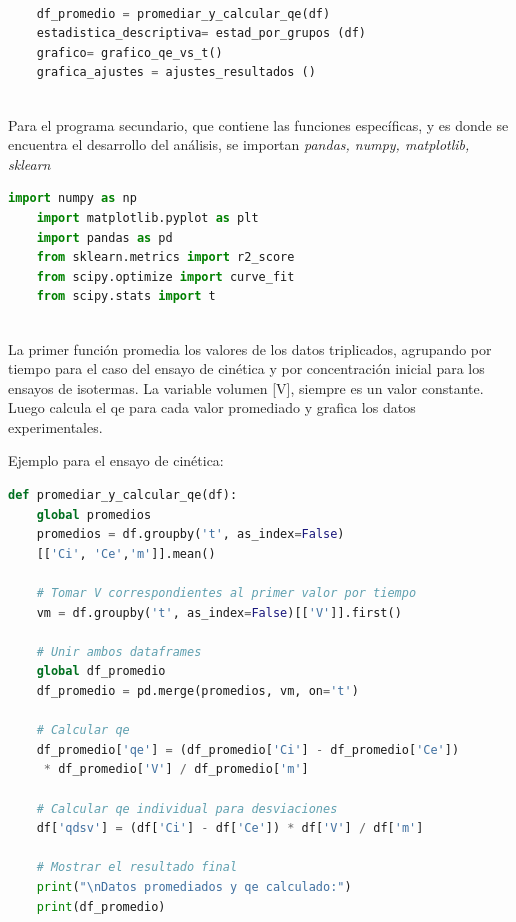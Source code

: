 \documentclass[]{article}
\begin{document}
  \begin{lstlisting}[language=Python,style=mystyle]
  	
  	df_promedio = promediar_y_calcular_qe(df)
  	estadistica_descriptiva= estad_por_grupos (df)
  	grafico= grafico_qe_vs_t()
  	grafica_ajustes = ajustes_resultados ()
  	
  \end{lstlisting} 
  
   Para el programa secundario, que contiene las funciones específicas, y es donde se encuentra el desarrollo del análisis,  se importan \textit{pandas, numpy, matplotlib, sklearn }
  \begin{lstlisting}[language=Python,style=mystyle]
  	import numpy as np
  	import matplotlib.pyplot as plt
  	import pandas as pd
  	from sklearn.metrics import r2_score
  	from scipy.optimize import curve_fit
  	from scipy.stats import t
  	
  \end{lstlisting}
  
  La primer función promedia los valores de los datos triplicados, agrupando por tiempo para el caso del ensayo de cinética y por concentración inicial para los ensayos de isotermas. La variable volumen [V], siempre es un valor constante. Luego calcula el qe para cada valor promediado y grafica los datos experimentales.
  
  
  
  
 Ejemplo para el ensayo de cinética:
 \begin{lstlisting}[language=Python,style=mystyle]	
 def promediar_y_calcular_qe(df):
 	global promedios
 	promedios = df.groupby('t', as_index=False)
 	[['Ci', 'Ce','m']].mean()
 	
 	# Tomar V correspondientes al primer valor por tiempo
 	vm = df.groupby('t', as_index=False)[['V']].first()
 	
 	# Unir ambos dataframes
 	global df_promedio
 	df_promedio = pd.merge(promedios, vm, on='t') 
 	
 	# Calcular qe
 	df_promedio['qe'] = (df_promedio['Ci'] - df_promedio['Ce'])
 	 * df_promedio['V'] / df_promedio['m']
 	
 	# Calcular qe individual para desviaciones
 	df['qdsv'] = (df['Ci'] - df['Ce']) * df['V'] / df['m']
 
 	# Mostrar el resultado final
 	print("\nDatos promediados y qe calculado:")
 	print(df_promedio)
 	
 \end{lstlisting} 
 
\end{document}
